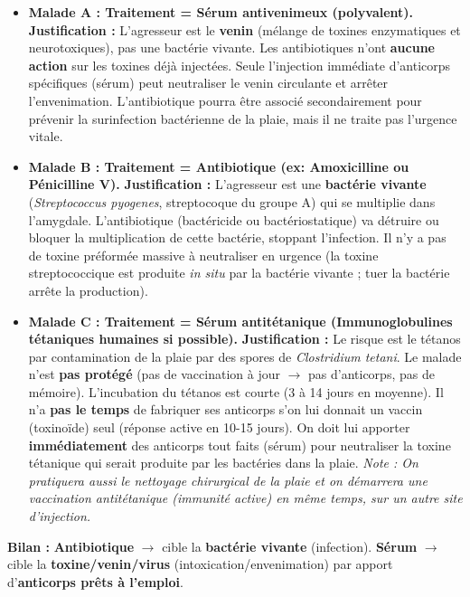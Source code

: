 \documentclass[11pt]{article}
\begin{document}
\begin{exoresolu}
\begin{itemize}
\item \textbf{Malade A : Traitement = Sérum antivenimeux (polyvalent).}
\textbf{Justification :} L'agresseur est le \textbf{venin} (mélange de toxines enzymatiques et neurotoxiques), pas une bactérie vivante. Les antibiotiques n'ont \textbf{aucune action} sur les toxines déjà injectées. Seule l'injection immédiate d'anticorps spécifiques (sérum) peut neutraliser le venin circulante et arrêter l'envenimation. L'antibiotique pourra être associé secondairement pour prévenir la surinfection bactérienne de la plaie, mais il ne traite pas l'urgence vitale.
\item \textbf{Malade B : Traitement = Antibiotique (ex: Amoxicilline ou Pénicilline V).}
\textbf{Justification :} L'agresseur est une \textbf{bactérie vivante} (\emph{Streptococcus pyogenes}, streptocoque du groupe A) qui se multiplie dans l'amygdale. L'antibiotique (bactéricide ou bactériostatique) va détruire ou bloquer la multiplication de cette bactérie, stoppant l'infection. Il n'y a pas de toxine préformée massive à neutraliser en urgence (la toxine streptococcique est produite \emph{in situ} par la bactérie vivante ; tuer la bactérie arrête la production).
\item \textbf{Malade C : Traitement = Sérum antitétanique (Immunoglobulines tétaniques humaines si possible).}
\textbf{Justification :} Le risque est le tétanos par contamination de la plaie par des spores de \emph{Clostridium tetani}. Le malade n'est \textbf{pas protégé} (pas de vaccination à jour $\rightarrow$ pas d'anticorps, pas de mémoire). L'incubation du tétanos est courte (3 à 14 jours en moyenne). Il n'a \textbf{pas le temps} de fabriquer ses anticorps s'on lui donnait un vaccin (toxinoïde) seul (réponse active en 10-15 jours). On doit lui apporter \textbf{immédiatement} des anticorps tout faits (sérum) pour neutraliser la toxine tétanique qui serait produite par les bactéries dans la plaie. \emph{Note : On pratiquera aussi le nettoyage chirurgical de la plaie et on démarrera une vaccination antitétanique (immunité active) en même temps, sur un autre site d'injection.}
\end{itemize}

\textbf{Bilan :} \textbf{Antibiotique} $\rightarrow$ cible la \textbf{bactérie vivante} (infection). \textbf{Sérum} $\rightarrow$ cible la \textbf{toxine/venin/virus} (intoxication/envenimation) par apport d'\textbf{anticorps prêts à l'emploi}.
\end{exoresolu}
\end{document}
